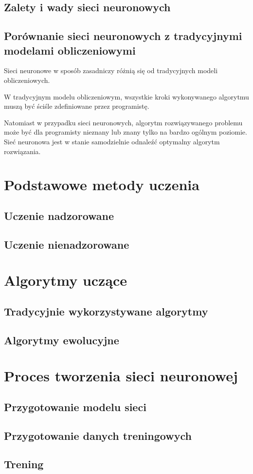 \subsection{Zalety i wady sieci neuronowych}

\subsection{Porównanie sieci neuronowych z tradycyjnymi modelami obliczeniowymi}
Sieci neuronowe w sposób zasadniczy różnią się od tradycyjnych modeli obliczeniowych.
 
W tradycyjnym modelu obliczeniowym, wszystkie kroki wykonywanego algorytmu muszą być ściśle zdefiniowane przez programistę.

Natomiast w przypadku sieci neuronowych, algorytm rozwiązywanego problemu może być dla programisty nieznany lub znany tylko na bardzo ogólnym poziomie.
Sieć neuronowa jest w stanie samodzielnie odnaleźć optymalny algorytm rozwiązania.

\newpage
\section{Podstawowe metody uczenia}
\subsection{Uczenie nadzorowane}
\subsection{Uczenie nienadzorowane}

\section{Algorytmy uczące}
\subsection{Tradycyjnie wykorzystywane algorytmy}
\subsection{Algorytmy ewolucyjne}

\section{Proces tworzenia sieci neuronowej}
\subsection{Przygotowanie modelu sieci}
\subsection{Przygotowanie danych treningowych}
\subsection{Trening}